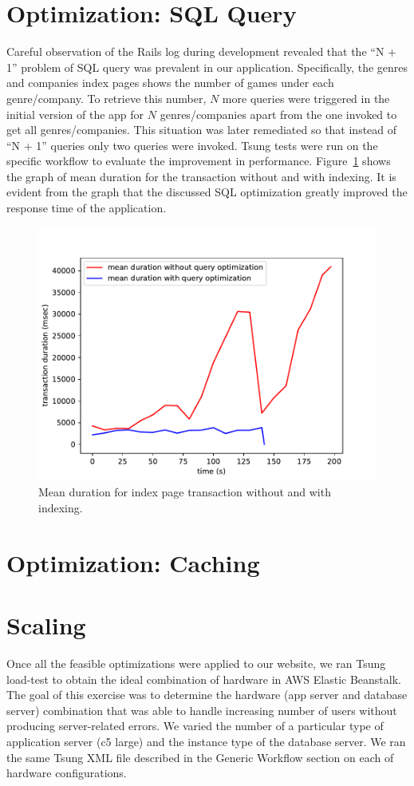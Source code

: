 \section{Optimization: SQL Query}
Careful observation of the Rails log during development revealed that the ``N + 1'' problem of SQL query was prevalent in our application. Specifically, the genres and companies index pages shows the number of games under each genre/company. To retrieve this number, $N$ more queries were triggered in the initial version of the app for $N$ genres/companies apart from the one invoked to get all genres/companies. This situation was later remediated so that instead of ``N + 1'' queries only two queries were invoked. Tsung tests were run on the specific workflow to evaluate the improvement in performance. Figure~\ref{fig:sqlopt} shows the graph of mean duration for the transaction without and with indexing. It is evident from the graph that the discussed SQL optimization greatly improved the response time of the application.
\begin{figure}
	\centering
	\includegraphics{images/list-pages-transaction-duration-without-query-with-query}
	\caption{Mean duration for index page transaction without and with indexing.}\label{fig:sqlopt}
\end{figure}

\section{Optimization: Caching}
\section{Scaling}
Once all the feasible optimizations were applied to our website, we ran Tsung load-test to obtain the ideal combination of hardware in AWS Elastic Beanstalk. The goal of this exercise was to determine the hardware (app server and database server) combination that was able to handle increasing number of users without producing server-related errors. We varied the number of a particular type of application server (c5 large) and the instance type of the database server. We ran the same Tsung XML file described in the Generic Workflow section on each of hardware configurations. 

